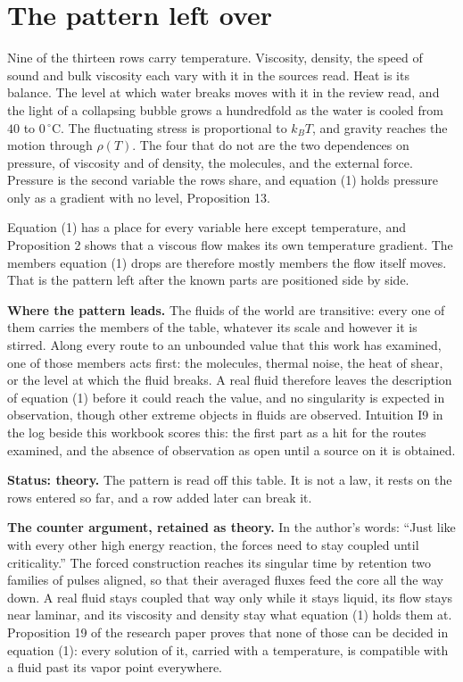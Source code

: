 \section{The pattern left over}

Nine of the thirteen rows carry temperature. Viscosity, density, the speed of sound and bulk
viscosity each vary with it in the sources read. Heat is its balance. The level at which water
breaks moves with it in the review read, and the light of a collapsing bubble grows a hundredfold
as the water is cooled from $40$ to $0\,^\circ$C. The fluctuating stress is proportional to $k_BT$,
and gravity reaches the motion through $\rho(T)$. The four that do not are the two dependences on
pressure, of viscosity and of density, the molecules, and the external force. Pressure is the
second variable the rows share, and equation (1) holds pressure only as a gradient with no level,
Proposition 13.

Equation (1) has a place for every variable here except temperature, and Proposition 2 shows that a
viscous flow makes its own temperature gradient. The members equation (1) drops are therefore
mostly members the flow itself moves. That is the pattern left after the known parts are positioned
side by side.

\textbf{Where the pattern leads.} The fluids of the world are transitive: every one of them carries
the members of the table, whatever its scale and however it is stirred. Along every route to an
unbounded value that this work has examined, one of those members acts first: the molecules,
thermal noise, the heat of shear, or the level at which the fluid breaks. A real fluid therefore
leaves the description of equation (1) before it could reach the value, and no singularity is
expected in observation, though other extreme objects in fluids are observed. Intuition I9 in the
log beside this workbook scores this: the first part as a hit for the routes examined, and the
absence of observation as open until a source on it is obtained.

\textbf{Status: theory.} The pattern is read off this table. It is not a law, it rests on the rows
entered so far, and a row added later can break it.

\textbf{The counter argument, retained as theory.} In the author's words: ``Just like with every other
high energy reaction, the forces need to stay coupled until criticality.'' The forced construction
reaches its singular time by retention two families of pulses aligned, so that their averaged
fluxes feed the core all the way down. A real fluid stays coupled that way only while it stays
liquid, its flow stays near laminar, and its viscosity and density stay what equation (1) holds
them at. Proposition 19 of the research paper proves that none of those can be decided in
equation (1): every solution of it, carried with a temperature, is compatible with a fluid past its
vapor point everywhere.

